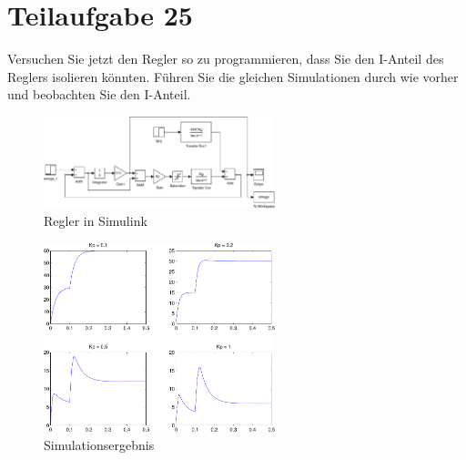 \section{Teilaufgabe 25}
\begin{aufgabe}
    Versuchen Sie jetzt den Regler so zu programmieren, dass Sie den I-Anteil 
    des Reglers isolieren könnten. Führen Sie die gleichen Simulationen durch 
    wie vorher und beobachten Sie den I-Anteil.
\end{aufgabe}
\begin{figure}[h!]
    \centering
    \includegraphics[width=0.6\textwidth]{25/regler_sat_isep.pdf}
    \caption{Regler in Simulink}
    \label{fig:25}
\end{figure}
\begin{figure}[h!]
    \centering
    \includegraphics[width=0.6\textwidth]{25/regler_sat_isep_plot.pdf}
    \caption{Simulationsergebnis}
    \label{fig:25plot}
\end{figure}

